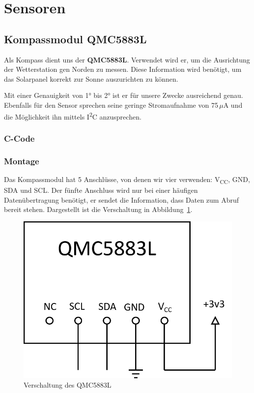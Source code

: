 \section{Sensoren}\label{sec:Sensoren}
\subsection{Kompassmodul QMC5883L}

Als Kompass dient uns der \textbf{QMC5883L}. Verwendet wird er, um die Ausrichtung der Wetterstation gen Norden zu messen. Diese Information wird benötigt, um das Solarpanel korrekt zur Sonne auszurichten zu können. 

Mit einer Genauigkeit von \ang{1} bis \ang{2} ist er für unsere Zwecke ausreichend genau. Ebenfalls für den Sensor sprechen seine geringe Stromaufnahme von 75\,$\mu$A und die Möglichkeit ihn mittels I\textsuperscript{2}C anzusprechen. 

\subsubsection{C-Code}

\subsubsection{Montage}

Das Kompassmodul hat 5 Anschlüsse, von denen wir vier verwenden: V\textsubscript{CC}, GND, SDA und SCL. Der fünfte Anschluss wird nur bei einer häufigen Datenübertragung benötigt, er sendet die Information, dass Daten zum Abruf bereit stehen. Dargestellt ist die Verschaltung in Abbildung~\ref{fig:QMC5883L_Plan}.

\begin{figure}[H]
  \centering
  \includegraphics[width=\textwidth]{./img/QMC5883L_Plan.png}
  \caption{Verschaltung des QMC5883L}\label{fig:QMC5883L_Plan}
\end{figure}

